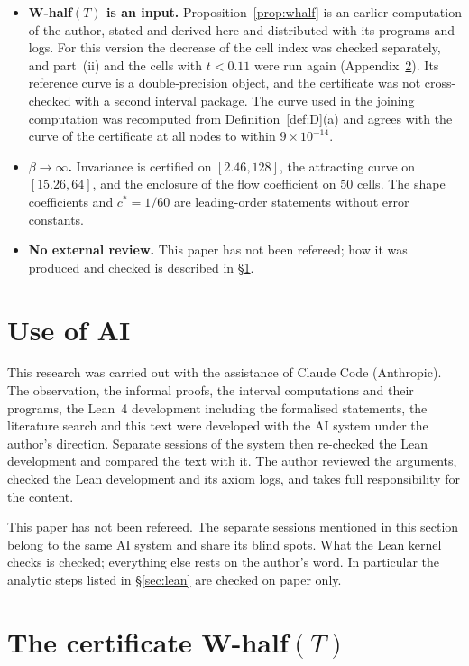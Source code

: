 \documentclass[11pt,a4paper]{article}
\theoremstyle{definition}
\theoremstyle{remark}
\begin{document}
\begin{itemize}
\item \textbf{W-half$(T)$ is an input.} Proposition~\ref{prop:whalf} is an earlier computation of the author, stated and derived here and distributed with its programs and logs. For this version the decrease of the cell index was checked separately, and part~(ii) and the cells with $t<0.11$ were run again (Appendix~\ref{app:whalf}). Its reference curve is a double-precision object, and the certificate was not cross-checked with a second interval package. The curve used in the joining computation was recomputed from Definition~\ref{def:D}(a) and agrees with the curve of the certificate at all nodes to within $9\times10^{-14}$.
\item \textbf{$\beta\to\infty$.} Invariance is certified on $[2.46,128]$, the attracting curve on $[15.26,64]$, and the enclosure of the flow coefficient on $50$ cells. The shape coefficients and $c^*=1/60$ are leading-order statements without error constants.
\item \textbf{No external review.} This paper has not been refereed; how it was produced and checked is described in \S\ref{sec:ai}.
\end{itemize}

\section{Use of AI}\label{sec:ai}

This research was carried out with the assistance of Claude Code (Anthropic). The observation, the informal proofs, the interval computations and their programs, the Lean~4 development including the formalised statements, the literature search and this text were developed with the AI system under the author's direction. Separate sessions of the system then re-checked the Lean development and compared the text with it. The author reviewed the arguments, checked the Lean development and its axiom logs, and takes full responsibility for the content.

This paper has not been refereed. The separate sessions mentioned in this section belong to the same AI system and share its blind spots. What the Lean kernel checks is checked; everything else rests on the author's word. In particular the analytic steps listed in \S\ref{sec:lean} are checked on paper only.

\appendix
\section{The certificate W-half\texorpdfstring{$(T)$}{(T)}}\label{app:whalf}
\end{document}
